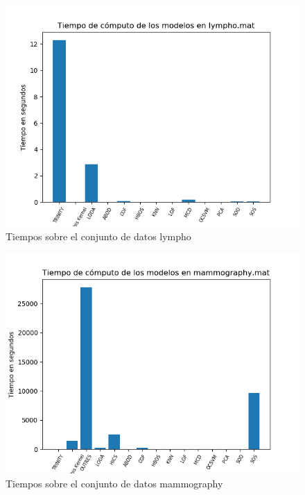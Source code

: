 \begin{figure}[H]
	\centering
	\includegraphics[scale=0.7]{imagenes/imgs-exp1/times/lympho}
	\caption{Tiempos sobre el conjunto de datos lympho}
	\label{lympho_times}
\end{figure}

\begin{figure}[H]
	\centering
	\includegraphics[scale=0.7]{imagenes/imgs-exp1/times/mammography}
	\caption{Tiempos sobre el conjunto de datos mammography}
	\label{mammography_times}
\end{figure}

